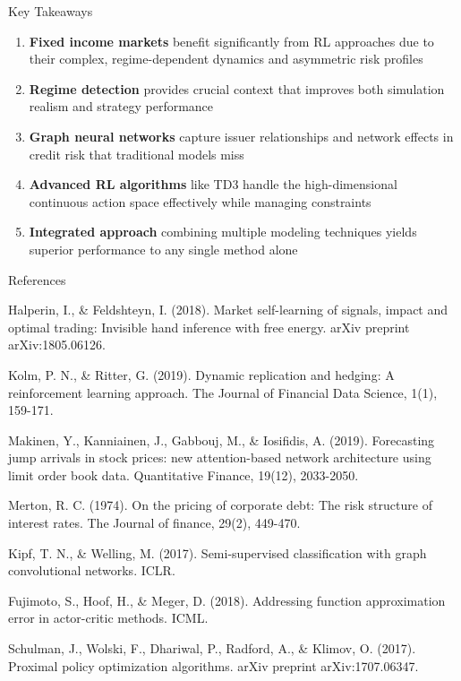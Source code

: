 \documentclass{beamer}
\begin{document}
\begin{frame}{Key Takeaways}
\begin{enumerate}
    \item \textbf{Fixed income markets} benefit significantly from RL approaches due to their complex, regime-dependent dynamics and asymmetric risk profiles
    
    \item \textbf{Regime detection} provides crucial context that improves both simulation realism and strategy performance
    
    \item \textbf{Graph neural networks} capture issuer relationships and network effects in credit risk that traditional models miss
    
    \item \textbf{Advanced RL algorithms} like TD3 handle the high-dimensional continuous action space effectively while managing constraints
    
    \item \textbf{Integrated approach} combining multiple modeling techniques yields superior performance to any single method alone
\end{enumerate}
\end{frame}

\begin{frame}{References}
\footnotesize
\begin{thebibliography}{99}
 Halperin, I., \& Feldshteyn, I. (2018). Market self-learning of signals, impact and optimal trading: Invisible hand inference with free energy. arXiv preprint arXiv:1805.06126.

 Kolm, P. N., \& Ritter, G. (2019). Dynamic replication and hedging: A reinforcement learning approach. The Journal of Financial Data Science, 1(1), 159-171.

 Makinen, Y., Kanniainen, J., Gabbouj, M., \& Iosifidis, A. (2019). Forecasting jump arrivals in stock prices: new attention-based network architecture using limit order book data. Quantitative Finance, 19(12), 2033-2050.

 Merton, R. C. (1974). On the pricing of corporate debt: The risk structure of interest rates. The Journal of finance, 29(2), 449-470.

 Kipf, T. N., \& Welling, M. (2017). Semi-supervised classification with graph convolutional networks. ICLR.

 Fujimoto, S., Hoof, H., \& Meger, D. (2018). Addressing function approximation error in actor-critic methods. ICML.

 Schulman, J., Wolski, F., Dhariwal, P., Radford, A., \& Klimov, O. (2017). Proximal policy optimization algorithms. arXiv preprint arXiv:1707.06347.
\end{thebibliography}
\end{frame}
\end{document}
